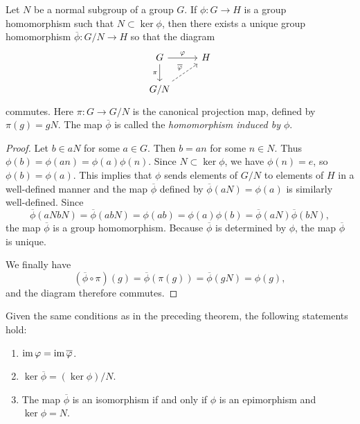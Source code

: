 \begin{theorem}
    \label{thm:induced-homomorphism}
    Let \(N\) be a normal subgroup of a group \(G\). If \(\phi: G \to H\) is a
    group homomorphism such that \(N \subset \ker \phi\), then there exists a
    unique group homomorphism \(\overline{\phi}: G/N \to H\) so that the diagram
    \[
        \begin{tikzcd}
            G \arrow{r}{\phi} \arrow[swap]{d}{\pi} & H \\
            G/N \arrow[dashed]{ur}{\overline{\phi}}
        \end{tikzcd}
    \]
    commutes. Here \(\pi: G \to G/N\) is the canonical projection map, defined
    by \(\pi(g) = gN\). The map \(\overline{\phi}\) is called the
    \emph{homomorphism induced by \(\phi\)}.
\end{theorem}

\begin{proof}
    Let \(b \in aN\) for some \(a \in G\). Then \(b = an\) for some \(n \in N\).
    Thus \(\phi(b) = \phi(an) = \phi(a)\phi(n)\). Since \(N \subset \ker \phi\),
    we have \(\phi(n) = e\), so \(\phi(b) = \phi(a)\). This implies that
    \(\phi\) sends elements of \(G/N\) to elements of \(H\) in a well-defined
    manner and the map \(\overline{\phi}\) defined by \(\overline{\phi}(aN) =
    \phi(a)\) is similarly well-defined. Since
    \[
    \overline{\phi}(aNbN) = \overline{\phi}(abN) = \phi(ab) = \phi(a)\phi(b) = \overline{\phi}(aN)\overline{\phi}(bN),
    \]
    the map \(\overline{\phi}\) is a group homomorphism. Because
    \(\overline{\phi}\) is determined by \(\phi\), the map \(\overline{\phi}\)
    is unique.

    We finally have
    \[
        (\overline{\phi} \circ \pi)(g) = \overline{\phi}(\pi(g)) = \overline{\phi}(gN) = \phi(g),
    \]
    and the diagram therefore commutes.
\end{proof}

\begin{theorem}
    Given the same conditions as in the preceding theorem, the following
    statements hold:
    \begin{enumerate}[label=(\alph*)]
        \item \(\operatorname{im} \varphi = \operatorname{im} \overline{\varphi}\).
        \item \(\ker \overline{\phi} = (\ker \phi)/N\).
        \item The map \(\overline{\phi}\) is an isomorphism if and only if
        \(\phi\) is an epimorphism and \(\ker \phi = N\).
    \end{enumerate}
\end{theorem}

